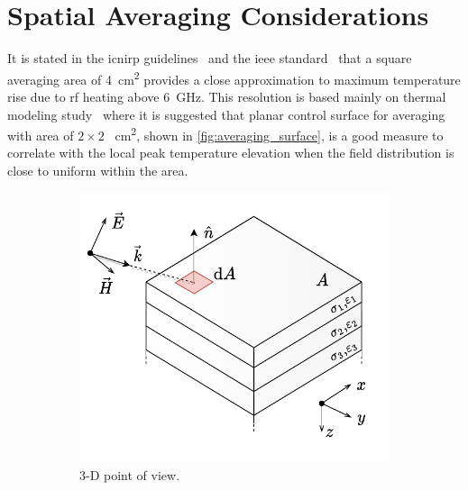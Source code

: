 \section{Spatial Averaging Considerations}
It is stated in the \gls{icnirp} guidelines~\cite{ICNIRP2020Guidelines} and the \gls{ieee} standard~\cite{IEEE2019Standard} that a square averaging area of \SI{4}{\cm\squared} provides a close approximation to maximum temperature rise due to \gls{rf} heating above \SI{6}{\GHz}.
This resolution is based mainly on thermal modeling study~\cite{Hashimoto2017On} where it is suggested that planar control surface for averaging with area of $2 \times 2$ \SI{}{\cm\squared}, shown in \cref{fig:averaging_surface}, is a good measure to correlate with the local peak temperature elevation when the field distribution is close to uniform within the area.
\begin{figure}[ht]
    \centering
    \begin{subfigure}[b]{0.51\textwidth}
        \centering
        \includegraphics[width=\linewidth]{artwork/averaging_surface.a.pdf}
        \caption{3-D point of view.}
        \label{fig:averaging_surface_a}
    \end{subfigure}
    \begin{subfigure}[b]{0.42\textwidth}
        \centering

\end{subfigure}
\end{figure}
